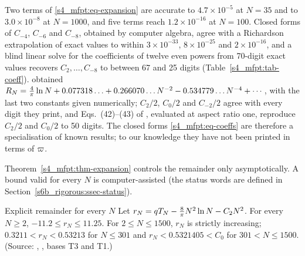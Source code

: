 Two terms of \eqref{s4_mfpt:eq-expansion} are accurate to $4.7\times10^{-5}$ at $N=35$ and to $3.0\times10^{-8}$ at
$N=1000$, and five terms reach $1.2\times10^{-16}$ at $N=100$. Closed forms of $C_{-4}$, $C_{-6}$ and $C_{-8}$, obtained by
computer algebra, agree with a Richardson extrapolation of exact values to within $3\times10^{-33}$, $8\times10^{-25}$ and
$2\times10^{-16}$, and a blind linear solve for the coefficients of twelve even powers from 70-digit exact values
recovers $C_{2},\dots,C_{-8}$ to between 67 and 25 digits (Table~\ref{s4_mfpt:tab-coeff}).
\citet{EssamWu2009} obtained $R_N=\frac4\pi\ln N+0.077318\ldots+0.266070\ldots N^{-2}-0.534779\ldots N^{-4}+\cdots$, with
the last two constants given numerically; $C_{2}/2$, $C_{0}/2$ and $C_{-2}/2$ agree with every digit they print, and
Eqs.~(42)--(43) of \citet{IzmailianHuang2010}, evaluated at aspect ratio one, reproduce $C_{2}/2$ and $C_{0}/2$ to 50
digits. The closed forms \eqref{s4_mfpt:eq-coeffs} are therefore a specialisation of known results; to our knowledge
they have not been printed in terms of $\varpi$.

Theorem~\ref{s4_mfpt:thm-expansion} controls the remainder only asymptotically. A bound valid for every $N$ is
computer-assisted (the status words are defined in Section~\ref{s6b_rigorous:ssec-status}).

\begin{catheorem}{Explicit remainder for every $N$}\label{s4_mfpt:thm-remainder}
Let $r_N=qT_{N}-\frac8\pi N^{2}\ln N-C_{2}N^{2}$. For every $N\ge2$, $-11.2\le r_N\le11.25$. For
$2\le N\le1500$, $r_N$ is strictly increasing;
$0.3211<r_N<0.53213$ for $N\le301$ and $r_N<0.5321405<C_{0}$ for
$301<N\le1500$.
\textup{(Source: , , bases T3 and T1.)}
\end{catheorem}

